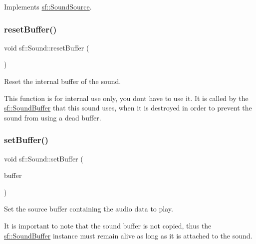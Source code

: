 Implements \mbox{\hyperlink{classsf_1_1_sound_source_a6e1bbb1f247ed8743faf3b1ed6f2bc21}{sf\+::\+Sound\+Source}}.

\mbox{\label{classsf_1_1_sound_acb7289d45e06fb76b8292ac84beb82a7}} 
\subsubsection{\texorpdfstring{resetBuffer()}{resetBuffer()}}
{\footnotesize\ttfamily void sf\+::\+Sound\+::reset\+Buffer (\begin{DoxyParamCaption}{ }\end{DoxyParamCaption})}



Reset the internal buffer of the sound. 

This function is for internal use only, you don\textquotesingle{}t have to use it. It is called by the \mbox{\hyperlink{classsf_1_1_sound_buffer}{sf\+::\+Sound\+Buffer}} that this sound uses, when it is destroyed in order to prevent the sound from using a dead buffer. \begin{DoxyVerb}\end{DoxyVerb}
 \mbox{\label{classsf_1_1_sound_a8b395e9713d0efa48a18628c8ec1972e}} 
\subsubsection{\texorpdfstring{setBuffer()}{setBuffer()}}
{\footnotesize\ttfamily void sf\+::\+Sound\+::set\+Buffer (\begin{DoxyParamCaption}\item[{const \mbox{\hyperlink{classsf_1_1_sound_buffer}{Sound\+Buffer}} \&}]{buffer }\end{DoxyParamCaption})}



Set the source buffer containing the audio data to play. 

It is important to note that the sound buffer is not copied, thus the \mbox{\hyperlink{classsf_1_1_sound_buffer}{sf\+::\+Sound\+Buffer}} instance must remain alive as long as it is attached to the sound.


